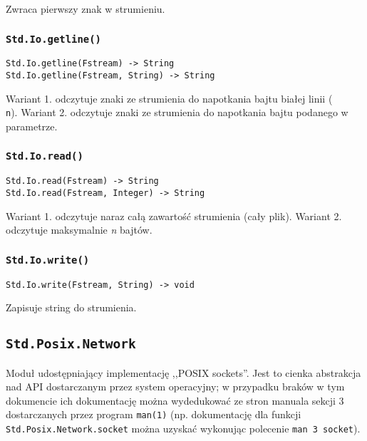 Zwraca pierwszy znak w strumieniu.

\subsubsection{\texttt{Std.Io.getline()}}

\begin{small}
\begin{lstlisting}
Std.Io.getline(Fstream) -> String
Std.Io.getline(Fstream, String) -> String
\end{lstlisting}
\end{small}

Wariant 1. odczytuje znaki ze strumienia do napotkania bajtu białej linii (\texttt{\\n}).
Wariant 2. odczytuje znaki ze strumienia do napotkania bajtu podanego w parametrze.

\subsubsection{\texttt{Std.Io.read()}}

\begin{small}
\begin{lstlisting}
Std.Io.read(Fstream) -> String
Std.Io.read(Fstream, Integer) -> String
\end{lstlisting}
\end{small}

Wariant 1. odczytuje naraz całą zawartość strumienia (cały plik).
Wariant 2. odczytuje maksymalnie \emph{n} bajtów.

\subsubsection{\texttt{Std.Io.write()}}

\begin{small}
\begin{lstlisting}
Std.Io.write(Fstream, String) -> void
\end{lstlisting}
\end{small}

Zapisuje string do strumienia.

\subsection{\texttt{Std.Posix.Network}}
\label{stdlib_Std_Posix_Network}

Moduł udostępniający implementację ,,POSIX sockets''. Jest to cienka abstrakcja nad API dostarczanym przez
system operacyjny; w przypadku braków w tym dokumencie ich dokumentację można wydedukować ze stron manuala
sekcji 3 dostarczanych przez program \texttt{man(1)} (np. dokumentację dla funkcji
\texttt{Std.Posix.Network.socket} można uzyskać wykonując polecenie \texttt{man 3 socket}).


